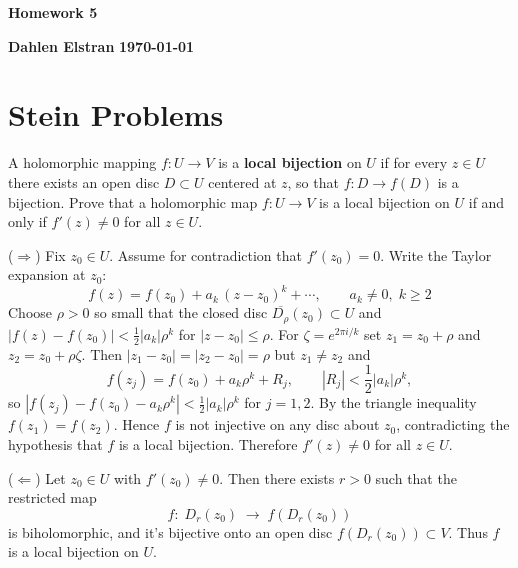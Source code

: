 \documentclass[12pt]{article}
\begin{document}
\begin{newtitle}
  \begin{center}
    \textbf{\Huge Homework 5}
  \end{center}
  \textbf{Dahlen Elstran} \hfill \textbf{\today}
\end{newtitle}

\section{Stein Problems}

\begin{statement}[8.5.1]
  A holomorphic mapping $f: U \to V$ is a \textbf{local bijection} on $U$ if for every $z \in U$ there exists an 
  open disc $D \subset U$ centered at $z$, so that $f: D \to f(D)$ is a bijection. Prove that a holomorphic 
  map $f:U \to V$ is a local bijection on $U$ if and only if $f'(z) \neq 0$ for all $z \in U$. 
\end{statement}
\begin{newproof}
    ($\Rightarrow$) Fix $z_0\in U$. Assume for contradiction that $f'(z_0)=0$. Write the Taylor expansion at $z_0$:
        $$ f(z)=f(z_0)+a_k\,(z-z_0)^k+\cdots , \qquad a_k\neq0,\; k\ge2 $$
    Choose $\rho>0$ so small that the closed disc $\overline{D_\rho}(z_0)\subset U$ and $|f(z)-f(z_0)|<\tfrac12|a_k|\rho^k$ for $|z-z_0|\le\rho$. For $\zeta=e^{2\pi i/k}$ set $z_1=z_0+\rho$ and $z_2=z_0+\rho\zeta$. Then $|z_1-z_0|=|z_2-z_0|=\rho$ but $z_1\neq z_2$ and
        $$ f(z_j)=f(z_0)+a_k\rho^k+R_j,\qquad |R_j|<\frac12|a_k|\rho^k , $$
    so $|f(z_j)-f(z_0)-a_k\rho^k|<\frac12|a_k|\rho^k$ for $j=1,2$. By the triangle inequality $f(z_1)=f(z_2)$. Hence $f$ is not injective on any disc about $z_0$, contradicting the hypothesis that $f$ is a local bijection. Therefore $f'(z)\neq0$ for all $z\in U$.
    \smallskip
    \par ($\Leftarrow$) Let $z_0\in U$ with $f'(z_0)\neq0$. Then there exists $r>0$ such that the restricted map
        $$ f:\; D_r(z_0)\;\longrightarrow\; f(D_r(z_0)) $$ 
    is biholomorphic, and it's bijective onto an open disc $f(D_r(z_0))\subset V$. Thus $f$ is a local bijection on $U$.
\end{newproof}
\end{document}
